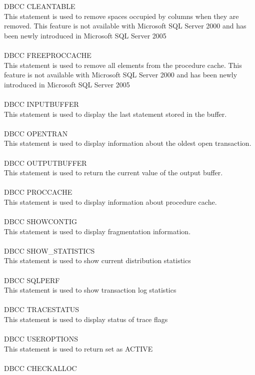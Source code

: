 \documentclass[english]{article}
\begin{document}
DBCC CLEANTABLE\\
This statement is used to remove spaces occupied by columns when they are removed. This feature is not available with Microsoft SQL Server 2000 and has been newly introduced in Microsoft SQL Server 2005
\\\\ 
DBCC FREEPROCCACHE\\
This statement is used to remove all elements from the procedure cache. This feature is not available with Microsoft SQL Server 2000 and has been newly introduced in Microsoft SQL Server 2005
\\\\ 
DBCC INPUTBUFFER\\
This statement is used to display the last statement stored in the buffer. 
\\\\ 
DBCC OPENTRAN\\
This statement is used to display information about the oldest open transaction. 
\\\\ 
DBCC OUTPUTBUFFER\\
This statement is used to return the current value of the output buffer. 
\\\\ 
DBCC PROCCACHE\\
This statement is used to display information about procedure cache. 
\\\\ 
DBCC SHOWCONTIG\\
This statement is used to display fragmentation information.
\\\\ 
DBCC SHOW\_STATISTICS\\
This statement is used to show current distribution statistics
\\\\ 
DBCC SQLPERF\\
This statement is used to show transaction log statistics
\\\\ 
DBCC TRACESTATUS\\
This statement is used to display status of trace flags
\\\\ 
DBCC USEROPTIONS\\
This statement is used to return set as ACTIVE
\\\\ 
DBCC CHECKALLOC\\
\end{document}
